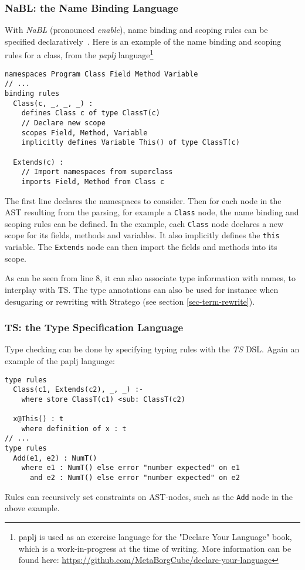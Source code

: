 \subsubsection{NaBL: the Name Binding Language}
\label{sec:orgheadline3}
With \emph{NaBL} (pronounced \emph{enable}), name binding and scoping rules can
be specified declaratively~\cite{KonatKWV12}. Here is an example
of the name binding and scoping rules for a class, from the \emph{paplj}
language\footnote{paplj is used as an exercise language for the
"Declare Your Language" book, which is a work-in-progress at the time
of writing. More information can be found here:
\url{https://github.com/MetaBorgCube/declare-your-language}}
\begin{verbatim}
namespaces Program Class Field Method Variable
// ...
binding rules
  Class(c, _, _, _) :
    defines Class c of type ClassT(c)
    // Declare new scope
    scopes Field, Method, Variable
    implicitly defines Variable This() of type ClassT(c)

  Extends(c) :
    // Import namespaces from superclass
    imports Field, Method from Class c
\end{verbatim}
The first line declares the namespaces to consider. Then for each node
in the AST resulting from the parsing, for example a \texttt{Class} node, the
name binding and scoping rules can be defined. In the example, each
\texttt{Class} node declares a new scope for its fields, methods and
variables. It also implicitly defines the \texttt{this} variable. The
\texttt{Extends} node can then import the fields and methods into its scope.

As can be seen from line 8, it can also associate type information
with names, to interplay with TS. The type annotations can also be
used for instance when desugaring or rewriting with Stratego (see
section \ref{sec-term-rewrite}).
\subsubsection{TS: the Type Specification Language}
\label{sec:orgheadline4}
Type checking can be done by specifying typing rules with the \emph{TS}
DSL. Again an example of the paplj language:
\begin{verbatim}
type rules
  Class(c1, Extends(c2), _, _) :-
    where store ClassT(c1) <sub: ClassT(c2)

  x@This() : t
    where definition of x : t
// ...
type rules
  Add(e1, e2) : NumT()
    where e1 : NumT() else error "number expected" on e1
      and e2 : NumT() else error "number expected" on e2
\end{verbatim}
Rules can recursively set constraints on AST-nodes, such as the \texttt{Add}
node in the above example.

